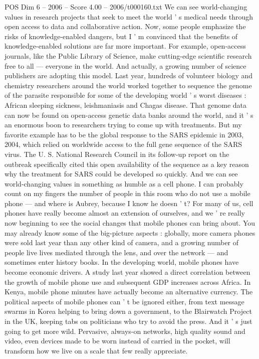 \begin{textsample}{POS Dim 6 – 2006 – Score 4.00 – 2006/t000160.txt}
We can see world-changing values in research projects that seek to meet the world ' s medical needs through open access to data and collaborative action.
Now, some people emphasize the risks of knowledge-enabled dangers, but I ' m convinced that the benefits of knowledge-enabled solutions are far more important.
For example, open-access journals, like the Public Library of Science, make cutting-edge scientific research free to all — everyone in the world.
And actually, a growing number of science publishers are adopting this model.
Last year, hundreds of volunteer biology and chemistry researchers around the world worked together to sequence the genome of the parasite responsible for some of the developing world ' s worst diseases : African sleeping sickness, leishmaniasis and Chagas disease.
That genome data can now be found on open-access genetic data banks around the world, and it ' s an enormous boon to researchers trying to come up with treatments.
But my favorite example has to be the global response to the SARS epidemic in 2003, 2004, which relied on worldwide access to the full gene sequence of the SARS virus.
The U.
S.
National Research Council in its follow-up report on the outbreak specifically cited this open availability of the sequence as a key reason why the treatment for SARS could be developed so quickly.
And we can see world-changing values in something as humble as a cell phone.
I can probably count on my fingers the number of people in this room who do not use a mobile phone — and where is Aubrey, because I know he doesn ' t?
For many of us, cell phones have really become almost an extension of ourselves, and we ' re really now beginning to see the social changes that mobile phones can bring about.
You may already know some of the big-picture aspects : globally, more camera phones were sold last year than any other kind of camera, and a growing number of people live lives mediated through the lens, and over the network — and sometimes enter history books.
In the developing world, mobile phones have become economic drivers.
A study last year showed a direct correlation between the growth of mobile phone use and subsequent GDP increases across Africa.
In Kenya, mobile phone minutes have actually become an alternative currency.
The political aspects of mobile phones can ' t be ignored either, from text message swarms in Korea helping to bring down a government, to the Blairwatch Project in the UK, keeping tabs on politicians who try to avoid the press.
And it ' s just going to get more wild.
Pervasive, always-on networks, high quality sound and video, even devices made to be worn instead of carried in the pocket, will transform how we live on a scale that few really appreciate.

\end{textsample}
